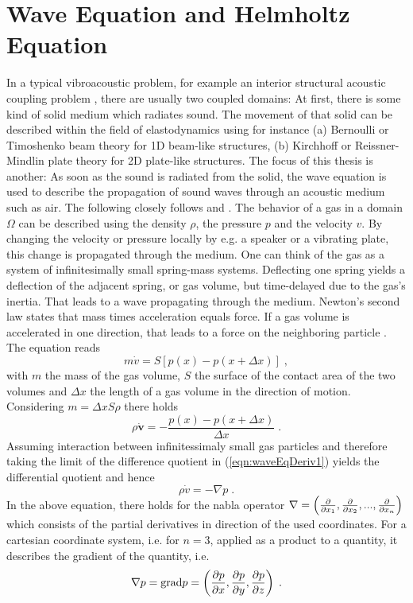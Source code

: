 \documentclass[%
  a4paper,oneside,%
  11pt,%
  smallchapters,
  style=printdev,
  extramargin,
  green,%
  rgb, <cmyk>
  ]{tubsbook}
\begin{document}
\section{Wave Equation and Helmholtz Equation}
In a typical vibroacoustic problem, for example an interior structural acoustic coupling problem \cite{atalla2015}, there are usually two coupled domains: At first, there is some kind of solid medium which radiates sound. The movement of that solid can be described within the field of elastodynamics using for instance (a) Bernoulli or Timoshenko beam theory for 1D beam-like structures, (b) Kirchhoff or Reissner-Mindlin plate theory for 2D plate-like structures. The focus of this thesis is another: As soon as the sound is radiated from the solid, the wave equation is used to describe the propagation of sound waves through an acoustic medium such as air. 
The following closely follows \cite{larson2013} and \cite{moser2005}.
The behavior of a gas in a domain $\Omega$ can be described using the density $\rho$, the pressure $p$ and the velocity $v$. By changing the velocity or pressure locally by e.g. a speaker or a vibrating plate, this change is propagated through the medium. One can think of the gas as a system of infinitesimally small spring-mass systems. Deflecting one spring yields a deflection of the adjacent spring, or gas volume, but time-delayed due to the gas's inertia. That leads to a wave propagating through the medium. 
Newton's second law states that mass times acceleration equals force. If a gas volume is accelerated in one direction, that leads to a force on the neighboring particle \cite{moser2005}. The equation reads
%
\begin{equation}
m \dot{v} = S  \left[  p(x) -p(x + \Delta x)  \right] \;,
\end{equation}
with $m$ the mass of the gas volume, $S$ the surface of the contact area of the two volumes  and $\Delta x$ the length of a gas volume in the direction of motion. Considering $m = \Delta x S \rho$ there holds
\begin{equation}
\rho \dot{\bm{v}} = - \frac{p(x) -p(x + \Delta x)}{\Delta x} \; .
\label{eqn:waveEqDeriv1}
\end{equation}
Assuming interaction between infinitessimaly small gas particles and therefore taking the limit of the difference quotient in (\ref{eqn:waveEqDeriv1}) yields the differential quotient and hence
\begin{equation}
\rho \dot{v} = - \nabla p \;.
\label{eqn:Tragheitsges}
\end{equation}
In the above equation, there holds for the nabla operator $\nabla =\left( \pdv{}{x_1},\pdv{}{x_2},...,\pdv{}{x_n} \right)$ which consists of the partial derivatives in direction of the used coordinates. For a cartesian coordinate system, i.e. for $n=3$, applied as a product to a quantity, it describes the gradient of the quantity, i.e.
\begin{equation}
\nabla p = \mathrm{grad}p = \left( \pdv{p}{x},\pdv{p}{y},\pdv{p}{z} \right) \;.
\end{equation}
\end{document}
